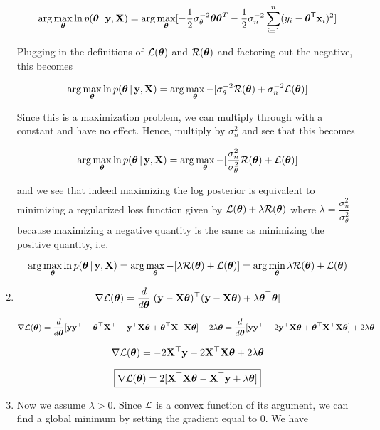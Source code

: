 \documentclass[submit]{harvardml}
\begin{document}
\begin{enumerate}
$$ \arg\max_{\boldsymbol{\theta}} \ln p(\boldsymbol{\theta} \,|\, \mathbf{y}, \mathbf{X})= \arg\max_{\boldsymbol{\theta}}  [- \frac{1}{2}\sigma^{-2}_\theta\boldsymbol{\theta}\boldsymbol{\theta}^T -\frac{1}{2}\sigma^{-2}_n \sum_{i=1}^n(y_i-\boldsymbol{\theta}^{\mathsf{T}} \mathbf{x}_i)^2 ]$$

Plugging in the definitions of $\mathcal{L}(\boldsymbol{\theta})$ and $\mathcal{R}(\boldsymbol{\theta})$ and factoring out the negative, this becomes

$$ \arg\max_{\boldsymbol{\theta}} \ln p(\boldsymbol{\theta} \,|\, \mathbf{y}, \mathbf{X})= \arg\max_{\boldsymbol{\theta}}  -[\sigma^{-2}_\theta\mathcal{R}(\boldsymbol{\theta}) +\sigma^{-2}_n \mathcal{L}(\boldsymbol{\theta}) ]$$

Since this is a maximization problem, we can multiply through with a constant and have no effect. Hence, multiply by $\sigma^{2}_n$ and see that this becomes

$$ \arg\max_{\boldsymbol{\theta}} \ln p(\boldsymbol{\theta} \,|\, \mathbf{y}, \mathbf{X})= \arg\max_{\boldsymbol{\theta}}  -[\frac{\sigma^{2}_n}{\sigma^{2}_\theta}\mathcal{R}(\boldsymbol{\theta}) + \mathcal{L}(\boldsymbol{\theta}) ]$$

and we see that indeed maximizing the log posterior is equivalent to minimizing a regularized loss function given by ${\mathcal{L}(\boldsymbol{\theta}) + \lambda \mathcal{R}(\boldsymbol{\theta})}$ where $\boxed{ \lambda = \dfrac{\sigma^{2}_n}{\sigma^{2}_\theta}}$ because maximizing a negative quantity is the same as minimizing the positive quantity, i.e.


$$ \arg\max_{\boldsymbol{\theta}} \ln p(\boldsymbol{\theta} \,|\, \mathbf{y}, \mathbf{X})= \arg\max_{\boldsymbol{\theta}}  -[\lambda\mathcal{R}(\boldsymbol{\theta}) + \mathcal{L}(\boldsymbol{\theta}) ] = \arg\min_{\boldsymbol{\theta}}  \lambda\mathcal{R}(\boldsymbol{\theta}) + \mathcal{L}(\boldsymbol{\theta})$$

\item

$$\nabla \mathcal{L}(\boldsymbol{\theta}) = \frac{d}{d\boldsymbol{\theta}}[(\mathbf{y} - \mathbf{X} \boldsymbol{\theta})^\top (\mathbf{y} - \mathbf{X}
\boldsymbol{\theta}) + \lambda \boldsymbol{\theta}^\top \boldsymbol{\theta}]$$

$$\nabla \mathcal{L}(\boldsymbol{\theta}) = \frac{d}{d\boldsymbol{\theta}}[\mathbf{y}\mathbf{y}^\top - \boldsymbol{\theta}^\top\mathbf{X}^\top - \mathbf{y}^\top \mathbf{X} \boldsymbol{\theta} + \boldsymbol{\theta}^\top\mathbf{X}^\top \mathbf{X} \boldsymbol{\theta}] + 2\lambda \boldsymbol{\theta} = \frac{d}{d\boldsymbol{\theta}}[\mathbf{y}\mathbf{y}^\top  - 2\mathbf{y}^\top \mathbf{X} \boldsymbol{\theta} + \boldsymbol{\theta}^\top\mathbf{X}^\top \mathbf{X} \boldsymbol{\theta}] + 2\lambda \boldsymbol{\theta}$$

$$\nabla \mathcal{L}(\boldsymbol{\theta}) =   - 2\mathbf{X}^\top \mathbf{y} + 2\mathbf{X}^\top\mathbf{X} \boldsymbol{\theta} + 2\lambda \boldsymbol{\theta}$$

$$\boxed{\nabla \mathcal{L}(\boldsymbol{\theta}) =  2[\mathbf{X}^\top\mathbf{X} \boldsymbol{\theta} - \mathbf{X}^\top \mathbf{y} + \lambda \boldsymbol{\theta}]}$$

\item Now we assume $\lambda > 0$. Since $\mathcal{L}$ is a convex function of its argument, we can find a global minimum by setting the gradient equal to $0$. We have 


\end{enumerate}
\end{document}
